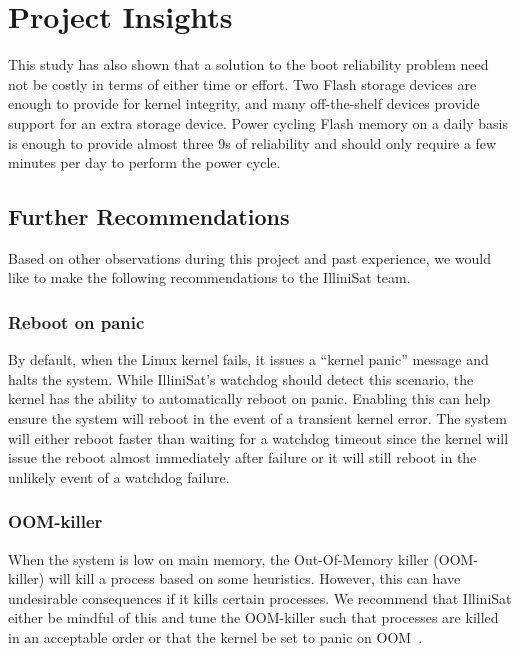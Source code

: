 \section{Project Insights}\label{sec:insights}

This study has also shown that a solution to the boot reliability problem need not be costly in terms of either time or effort.  Two Flash storage devices are enough to provide for kernel integrity, and many off-the-shelf devices provide support for an extra storage device.  Power cycling Flash memory on a daily basis is enough to provide almost three 9s of reliability and should only require a few minutes per day to perform the power cycle.

\subsection{Further Recommendations}
Based on other observations during this project and past experience, we would
like to make the following recommendations to the IlliniSat team.

\subsubsection{Reboot on panic} By default, when the Linux kernel fails, it
issues a ``kernel panic'' message and halts the system.  While IlliniSat's
watchdog should detect this scenario, the kernel has the ability to
automatically reboot on panic.  Enabling this can help ensure the system will
reboot in the event of a transient kernel error. The system will either reboot
faster than waiting for a watchdog timeout since the kernel will issue the
reboot almost immediately after failure or it will still reboot in the unlikely
event of a watchdog failure.

\subsubsection{OOM-killer} When the system is low on main memory, the
Out-Of-Memory killer (OOM-killer) will kill a process based on some heuristics.
However, this can have undesirable consequences if it kills certain processes.
We recommend that IlliniSat either be mindful of this and tune the OOM-killer
such that processes are killed in an acceptable order or that the kernel be set
to panic on OOM~\cite{oracle_oom}.
